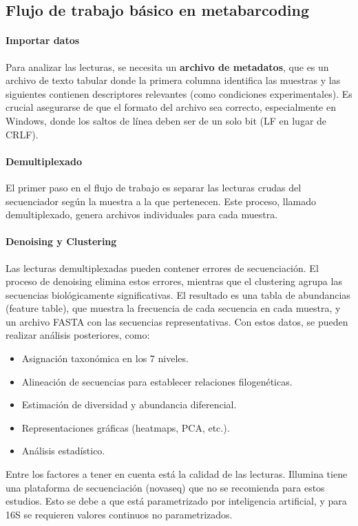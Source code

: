 \subsection{Flujo de trabajo básico en metabarcoding}
\paragraph{Importar datos}
Para analizar las lecturas, se necesita un \textbf{archivo de metadatos}, que es un archivo de texto tabular donde la primera columna identifica las muestras y las siguientes contienen descriptores relevantes (como condiciones experimentales). Es crucial asegurarse de que el formato del archivo sea correcto, especialmente en Windows, donde los saltos de línea deben ser de un solo bit (LF en lugar de CRLF).

\paragraph{Demultiplexado} El primer paso en el flujo de trabajo es separar las lecturas crudas del secuenciador según la muestra a la que pertenecen. Este proceso, llamado demultiplexado, genera archivos individuales para cada muestra.

\paragraph{Denoising y Clustering}
Las lecturas demultiplexadas pueden contener errores de secuenciación. El proceso de denoising elimina estos errores, mientras que el clustering agrupa las secuencias biológicamente significativas. El resultado es una tabla de abundancias (feature table), que muestra la frecuencia de cada secuencia en cada muestra, y un archivo FASTA con las secuencias representativas.
Con estos datos, se pueden realizar análisis posteriores, como:
\begin{itemize}
\item Asignación taxonómica en los 7 niveles.
\item Alineación de secuencias para establecer relaciones filogenéticas.
\item Estimación de diversidad y abundancia diferencial.
\item Representaciones gráficas (heatmaps, PCA, etc.).
\item Análisis estadístico.
\end{itemize}

Entre los factores a tener en cuenta está la calidad de las lecturas. Illumina tiene una plataforma de secuenciación (novaseq) que no se recomienda para estos estudios. Esto se debe a que está parametrizado por inteligencia artificial, y para 16S se requieren valores continuos no parametrizados. 

